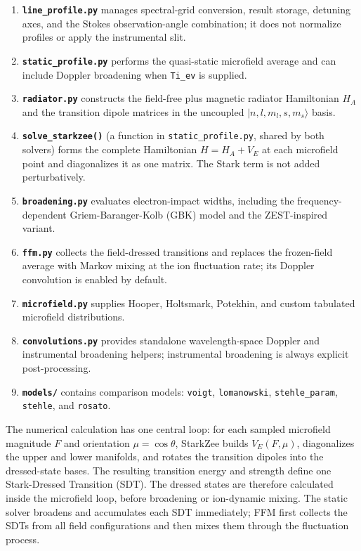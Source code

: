 \documentclass[11pt,a4paper]{article}
\numberwithin{equation}{section}
\begin{document}
\begin{enumerate}
    \item \textbf{\texttt{line\_profile.py}} manages spectral-grid conversion, result storage, detuning axes, and the Stokes observation-angle combination; it does not normalize profiles or apply the instrumental slit.
    \item \textbf{\texttt{static\_profile.py}} performs the quasi-static microfield average and can include Doppler broadening when \texttt{Ti\_ev} is supplied.
    \item \textbf{\texttt{radiator.py}} constructs the field-free plus magnetic radiator Hamiltonian $H_A$ and the transition dipole matrices in the uncoupled $|n,l,m_l,s,m_s\rangle$ basis.
    \item \textbf{\texttt{solve\_starkzee()}} (a function in \texttt{static\_profile.py}, shared by both solvers) forms the complete Hamiltonian $H = H_A + V_E$ at each microfield point and diagonalizes it as one matrix.  The Stark term is not added perturbatively.
    \item \textbf{\texttt{broadening.py}} evaluates electron-impact widths, including the frequency-dependent Griem-Baranger-Kolb (GBK) model and the ZEST-inspired variant.
    \item \textbf{\texttt{ffm.py}} collects the field-dressed transitions and replaces the frozen-field average with Markov mixing at the ion fluctuation rate; its Doppler convolution is enabled by default.
    \item \textbf{\texttt{microfield.py}} supplies Hooper, Holtsmark, Potekhin, and custom tabulated microfield distributions.
    \item \textbf{\texttt{convolutions.py}} provides standalone wavelength-space Doppler and instrumental broadening helpers; instrumental broadening is always explicit post-processing.
    \item \textbf{\texttt{models/}} contains comparison models: \texttt{voigt}, \texttt{lomanowski}, \texttt{stehle\_param}, \texttt{stehle}, and \texttt{rosato}.
\end{enumerate}

The numerical calculation has one central loop: for each sampled microfield magnitude $F$ and orientation $\mu=\cos\theta$, StarkZee builds $V_E(F,\mu)$, diagonalizes the upper and lower manifolds, and rotates the transition dipoles into the dressed-state bases. The resulting transition energy and strength define one Stark-Dressed Transition (SDT). The dressed states are therefore calculated inside the microfield loop, before broadening or ion-dynamic mixing. The static solver broadens and accumulates each SDT immediately; FFM first collects the SDTs from all field configurations and then mixes them through the fluctuation process.
\end{document}
